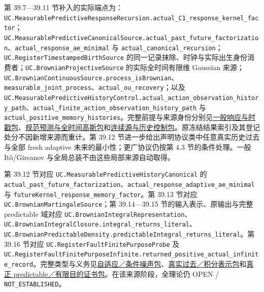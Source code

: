 \documentclass[
  11pt,
  oneside]{book}
\begin{document}
第 39.7---39.11 节补入的实际端点为：\nolinkurl{UC.MeasurablePredictiveResponseRecursion.actual_C1_response_kernel_factor}；\nolinkurl{UC.MeasurablePredictiveCanonicalSource.actual_past_future_factorization}、\nolinkurl{actual_response_ae_minimal} 与 \nolinkurl{actual_canonical_recursion}；\nolinkurl{UC.RegisterTimestampedBirthSource} 的同一记录抹除、时钟与实际出生身份消费者；\nolinkurl{UC.BrownianProjectiveSource} 的实际全时间有限维 Gaussian 来源；\nolinkurl{UC.BrownianContinuousSource.process_isBrownian}、\nolinkurl{measurable_joint_process}、\nolinkurl{actual_ou_recovery}；以及 \nolinkurl{UC.MeasurablePredictiveHistoryControl.actual_action_observation_history_path}、\nolinkurl{actual_finite_action_observation_history_path} 与 \nolinkurl{actual_positive_memory_histories}。完整前提与来源身份分别见\href{../formalization/ueot-core/docs/compression/theory_completion/unified_closure/predictive_genealogy_source_v1/RESULTS_AND_OPEN_OBLIGATIONS.md}{一般响应与时戳包}、\href{../formalization/ueot-core/docs/compression/theory_completion/unified_closure/canonical_brownian_source_v1/RESULTS_AND_OPEN_OBLIGATIONS.md}{规范预测与全时间高斯包}和\href{../formalization/ueot-core/docs/compression/theory_completion/unified_closure/continuous_history_source_v1/RESULTS_AND_OPEN_OBLIGATIONS.md}{连续源与历史控制包}。原冻结结果索引及其登记处分不因新增来源而重计。第 39.12 节进一步给出声明协议类中任意真实历史过去与全部 fresh adaptive 未来的最小性；更广协议仍按第 4.3 节的条件处理。一般 Itô/Girsanov 与全局总装不由这些局部来源自动取得。

第 39.12 节对应 \nolinkurl{UC.MeasurablePredictiveHistoryCanonical} 的 \nolinkurl{actual_past_future_factorization}、\nolinkurl{actual_response_adaptive_ae_minimal} 与 \nolinkurl{futureKernel_response_memory_factor}。第 39.13 节对应 \nolinkurl{UC.BrownianMartingaleSource}；第 39.14---39.15 节的输入表示、原输出与完整 predictable 域对应 \nolinkurl{UC.BrownianIntegralRepresentation}、\nolinkurl{UC.BrownianIntegralClosure.integral_returns_literal}、\nolinkurl{UC.BrownianPredictableDensity.predictableIntegral_returns_literal}。第 39.16 节对应 \nolinkurl{UC.RegisterFaultFinitePurposeProbe} 及 \nolinkurl{UC.RegisterFaultFinitePurposeInfinite.returned_positive_actual_infinite_record}。完整类型与义务见\href{../formalization/ueot-core/docs/compression/theory_completion/unified_closure/adaptive_stochastic_sources_v1/RESULTS_AND_OPEN_OBLIGATIONS.md}{自适应／条件噪声包}、\href{../formalization/ueot-core/docs/compression/theory_completion/unified_closure/history_integral_source_v1/RESULTS_AND_OPEN_OBLIGATIONS.md}{真实过去／积分表示包}和\href{../formalization/ueot-core/docs/compression/theory_completion/unified_closure/predictable_finite_purpose_v1/RESULTS_AND_OPEN_OBLIGATIONS.md}{真正 predictable／有限目的证书包}。在该来源阶段，全理论仍 OPEN / \nolinkurl{NOT_ESTABLISHED}。
\end{document}
